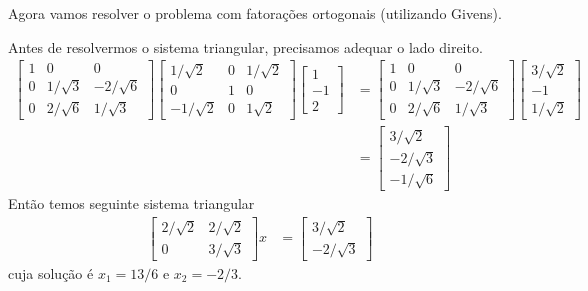 \documentclass[a4paper,12pt, leqno, answers]{exam}
\begin{document}
\begin{questions}
\begin{parts}
\begin{solution}
            Agora vamos resolver o problema com fatora\c{c}\~{o}es ortogonais (utilizando Givens).

            Antes de resolvermos o sistema triangular, precisamos adequar o lado direito.
            \begin{align*}
                \begin{bmatrix}
                    1 & 0 & 0 \\
                    0 & 1 / \sqrt{3} & -2 / \sqrt{6} \\
                    0 & 2 / \sqrt{6} & 1 / \sqrt{3}
                \end{bmatrix} \begin{bmatrix}
                    1 / \sqrt{2} & 0 & 1 / \sqrt{2} \\
                    0 & 1 & 0 \\
                    - 1 / \sqrt{2} & 0 & 1 \sqrt{2}
                \end{bmatrix} \begin{bmatrix}
                    1 \\
                    -1 \\
                    2
                \end{bmatrix} &= \begin{bmatrix}
                    1 & 0 & 0 \\
                    0 & 1 / \sqrt{3} & -2 / \sqrt{6} \\
                    0 & 2 / \sqrt{6} & 1 / \sqrt{3}
                \end{bmatrix} \begin{bmatrix}
                    3 / \sqrt{2}  \\
                    -1 \\
                    1 / \sqrt{2}
                \end{bmatrix} \\
                &= \begin{bmatrix}
                    3 / \sqrt{2}  \\
                    -2 / \sqrt{3} \\
                    - 1 / \sqrt{6}
                \end{bmatrix} 
            \end{align*}
            Ent\~{a}o temos seguinte sistema triangular
            \begin{align*}
                \begin{bmatrix}
                    2 / \sqrt{2} & 2 / \sqrt{2} \\
                    0 & 3 / \sqrt{3}
                \end{bmatrix} x &= \begin{bmatrix}
                    3 / \sqrt{2} \\
                    -2 / \sqrt{3}
                \end{bmatrix}
            \end{align*}
            cuja solu\c{c}\~{a}o \'{e} $x_1 = 13 / 6$ e $x_2 = -2 / 3$.
        \end{solution}
    \end{parts}


\end{questions}
\end{document}
